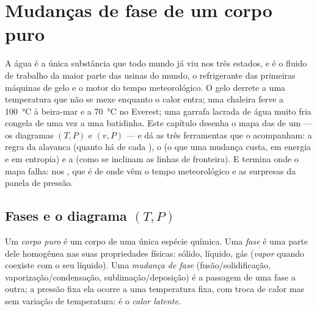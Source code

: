 \chapter{Mudanças de fase de um corpo puro}\label{ch:b1:phase-changes}

A água é a única substância que todo mundo já viu nos três estados, e é o
fluido de trabalho da maior parte das usinas do mundo, o refrigerante das
primeiras máquinas de gelo e o motor do tempo meteorológico. O gelo derrete
a uma temperatura que não se mexe enquanto o calor entra; uma chaleira ferve
a \qty{100}{\degreeCelsius} à beira-mar e a \qty{70}{\degreeCelsius} no
Everest; uma garrafa lacrada de água muito fria congela de uma vez a uma
batidinha. Este capítulo desenha o mapa das  de um  --- os
diagramas $(T, P)$ e $(v, P)$ --- e dá as três ferramentas que o acompanham:
a regra da alavanca (quanto há de cada ), o  (o que uma
mudança custa, em energia e em entropia) e a  (como se inclinam as linhas de fronteira). E termina
onde o mapa falha: nos , que é de onde vêm o tempo
meteorológico e as surpresas da panela de pressão.

\section{Fases e o diagrama $(T, P)$}

\begin{definition}\label{def:b1:phase-changes:phase}
Um \emph{corpo puro} é um corpo de uma única espécie química. Uma
\emph{fase} é uma parte dele homogênea nas suas propriedades físicas:
sólido, líquido, gás (\emph{vapor} quando coexiste com o seu líquido). Uma
\emph{mudança de fase} (fusão/solidificação, vaporização/condensação,
sublimação/deposição) é a passagem de uma fase a outra; a pressão fixa ela
ocorre a uma temperatura fixa, com troca de calor mas sem variação de
temperatura: é o \emph{calor latente}.
\end{definition}

